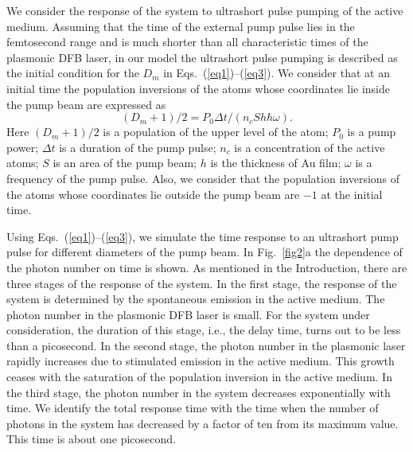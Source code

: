 \documentclass[aps,pra,amsmath,amssymb,onecolumn,superscriptaddress,showpacs,floatfix,]{revtex4-1}
\begin{document}
We consider the response of the system to ultrashort pulse pumping of the active medium.
Assuming that the time of the external pump pulse lies in the femtosecond range and is much shorter than all characteristic times of the plasmonic DFB laser, in our model the ultrashort pulse pumping is described as the initial condition for the $D_m$ in Eqs.~(\ref{eq1})--(\ref{eq3}). We consider that at an initial time the population inversions of the atoms whose coordinates lie inside the pump beam are expressed as
\begin{equation}\label{eq5SM}
{\left(D_m+1\right)/2} = {P_0 \Delta t / \left(n_c S h \hbar \omega \right)}. 
\end{equation}
Here $\left(D_m+1\right)/2$ is a population of the upper level of the atom; $P_0$ is a pump power; $\Delta t$ is a duration of the pump pulse; $n_c$ is a concentration of the active atoms; $S$ is an area of the pump beam; $h$ is the thickness of Au film; $\omega$ is a frequency of the pump pulse. Also, we consider that the population inversions of the atoms whose coordinates lie outside the pump beam are $-1$ at the initial time.

Using Eqs.~(\ref{eq1})--(\ref{eq3}), we simulate the time response to an ultrashort pump pulse for different diameters of the pump beam.
In Fig.~\ref{fig2}a the dependence of the photon number on time is shown.
As mentioned in the Introduction, there are three stages of the response of the system.
In the first stage, the response of the system is determined by the spontaneous emission in the active medium.
The photon number in the plasmonic DFB laser is small.
For the system under consideration, the duration of this stage, i.e., the delay time, turns out to be less than a picosecond.
In the second stage, the photon number in the plasmonic laser rapidly increases due to stimulated emission in the active medium.
This growth ceases with the saturation of the population inversion in the active medium.
In the third stage, the photon number in the system decreases exponentially with time.
We identify the total response time with the time when the number of photons in the system has decreased by a factor of ten from its maximum value.
This time is about one picosecond.
  
\end{document}
